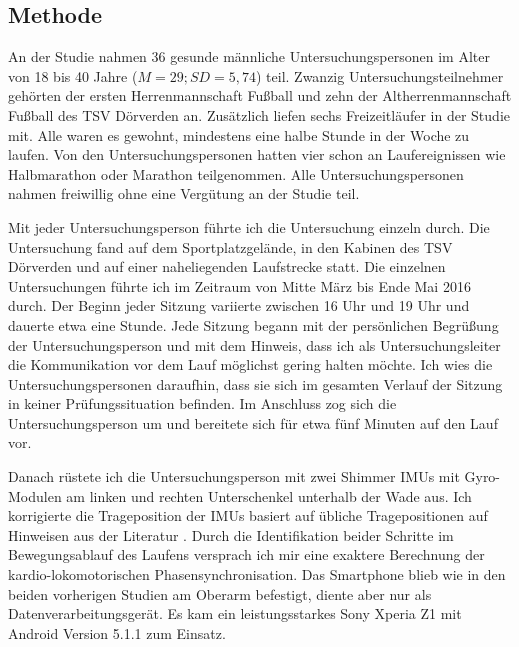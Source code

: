 \subsection{Methode} 

\label{sub:methode_5_3}

An der Studie nahmen 36 gesunde männliche Untersuchungspersonen im Alter von 18 bis 40 Jahre ($M = 29; SD = 5{,}74$) teil. Zwanzig Untersuchungsteilnehmer gehörten der ersten Herrenmannschaft Fußball und zehn der Altherrenmannschaft Fußball des TSV Dörverden an. Zusätzlich liefen sechs Freizeitläufer in der Studie mit. Alle waren es gewohnt, mindestens eine halbe Stunde in der Woche zu laufen. Von den Untersuchungspersonen hatten vier schon an Laufereignissen wie Halbmarathon oder Marathon teilgenommen. Alle Untersuchungspersonen nahmen freiwillig ohne eine Vergütung an der Studie teil. 

Mit jeder Untersuchungsperson führte ich die Untersuchung einzeln durch. Die Untersuchung fand auf dem Sportplatzgelände, in den Kabinen des TSV Dörverden und auf einer naheliegenden Laufstrecke statt. Die einzelnen Untersuchungen führte ich im Zeitraum von Mitte März bis Ende Mai 2016 durch. Der Beginn jeder Sitzung variierte zwischen 16 Uhr und 19 Uhr und dauerte etwa eine Stunde. Jede Sitzung begann mit der persönlichen Begrüßung der Untersuchungsperson und mit dem Hinweis, dass ich als Untersuchungsleiter die Kommunikation vor dem Lauf möglichst gering halten möchte. Ich wies die Untersuchungspersonen daraufhin, dass sie sich im gesamten Verlauf der Sitzung in keiner Prüfungssituation befinden. Im Anschluss zog sich die Untersuchungsperson um und bereitete sich für etwa fünf Minuten auf den Lauf vor. 

Danach rüstete ich die Untersuchungsperson mit zwei Shimmer \acp{IMU} mit Gyro-Modulen am linken und rechten Unterschenkel unterhalb der Wade aus. Ich korrigierte die Trageposition der \acp{IMU} basiert auf übliche Tragepositionen auf Hinweisen aus der Literatur \citep{Hreljac1993}. Durch die Identifikation beider Schritte im Bewegungsablauf des Laufens versprach ich mir eine exaktere Berechnung der kardio-lokomotorischen Phasensynchronisation. Das Smartphone blieb wie in den beiden vorherigen Studien am Oberarm befestigt, diente aber nur als Datenverarbeitungsgerät. Es kam ein leistungsstarkes Sony Xperia Z1 mit Android Version 5.1.1 zum Einsatz.

